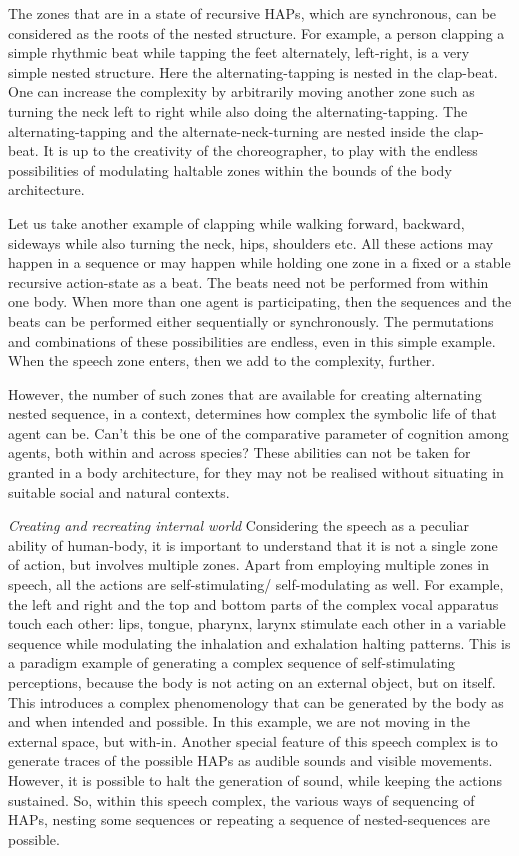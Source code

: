 The zones that are in a state of recursive HAPs, which are synchronous, can be considered as the roots of the nested structure. For example, a person clapping a simple rhythmic beat while tapping the feet alternately, left-right, is a very simple nested structure. Here the alternating-tapping is nested in the clap-beat. One can increase the complexity by arbitrarily moving another zone such as turning the neck left to right while also doing the alternating-tapping. The alternating-tapping and the alternate-neck-turning are nested inside the clap-beat. It is up to the creativity of the choreographer, to play with the endless possibilities of modulating haltable zones within the bounds of the body architecture. 

Let us take another example of clapping while walking forward, backward, sideways while also turning the neck, hips, shoulders etc. All these actions may happen in a sequence or may happen while holding one zone in a fixed or a stable recursive action-state as a beat. The beats need not be performed from within one body. When more than one agent is participating, then the sequences and the beats can be performed either sequentially or synchronously. The permutations and combinations of these possibilities are endless, even in this simple example. When the speech zone enters, then we add to the complexity, further. 

However, the number of such zones that are available for creating alternating nested sequence, in a context, determines how complex the symbolic life of that agent can be. Can't this be one of the comparative parameter of cognition among agents, both within and across species? These abilities can not be taken for granted in a body architecture, for they may not be realised without situating in suitable social and natural contexts. 

\emph{Creating and recreating internal world} Considering the speech as a peculiar ability of human-body, it is important to understand that it is not a single zone of action, but involves multiple zones. Apart from employing multiple zones in speech, all the actions are self-stimulating/ self-modulating as well. For example, the left and right and the top and bottom parts of the complex vocal apparatus touch each other: lips, tongue, pharynx, larynx stimulate each other in a variable sequence while modulating the inhalation and exhalation halting patterns. This is a paradigm example of generating a complex sequence of self-stimulating perceptions, because the body is not acting on an external object, but on itself. This introduces a complex phenomenology that can be generated by the body as and when intended and possible. In this example, we are not moving in the external space, but with-in. Another special feature of this speech complex is to generate traces of the possible HAPs as audible sounds and visible movements. However, it is possible to halt the generation of sound, while keeping the actions sustained. So, within this speech complex, the various ways of sequencing of HAPs, nesting some sequences or repeating a sequence of nested-sequences are possible. 

